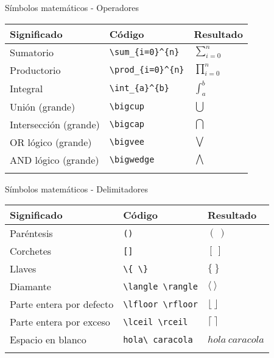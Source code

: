 \documentclass[
  ignorenonframetext,
]{beamer}
\begin{document}
\begin{frame}[fragile]{Símbolos matemáticos - Operadores}
\label{suxedmbolos-matemuxe1ticos---operadores}
\begin{longtable}[]{@{}lll@{}}
\toprule\noalign{}
Significado & Código & Resultado \\
\midrule\noalign{}
\endhead
Sumatorio & \texttt{\textbackslash{}sum\_\{i=0\}\^{}\{n\}} &
\(\sum_{i=0}^{n}\) \\
Productorio & \texttt{\textbackslash{}prod\_\{i=0\}\^{}\{n\}} &
\(\prod_{i=0}^{n}\) \\
Integral & \texttt{\textbackslash{}int\_\{a\}\^{}\{b\}} &
\(\int_{a}^{b}\) \\
Unión (grande) & \texttt{\textbackslash{}bigcup} & \(\bigcup\) \\
Intersección (grande) & \texttt{\textbackslash{}bigcap} & \(\bigcap\) \\
OR lógico (grande) & \texttt{\textbackslash{}bigvee} & \(\bigvee\) \\
AND lógico (grande) & \texttt{\textbackslash{}bigwedge} &
\(\bigwedge\) \\
\bottomrule\noalign{}
\end{longtable}
\end{frame}

\begin{frame}[fragile]{Símbolos matemáticos - Delimitadores}
\label{suxedmbolos-matemuxe1ticos---delimitadores}
\begin{longtable}[]{@{}lll@{}}
\toprule\noalign{}
Significado & Código & Resultado \\
\midrule\noalign{}
\endhead
Paréntesis & \texttt{()} & \((\ )\) \\
Corchetes & \texttt{{[}{]}} & \([\ ]\) \\
Llaves & \texttt{\textbackslash{}\{\ \textbackslash{}\}} & \(\{\ \}\) \\
Diamante & \texttt{\textbackslash{}langle\ \textbackslash{}rangle} &
\(\langle\ \rangle\) \\
Parte entera por defecto &
\texttt{\textbackslash{}lfloor\ \textbackslash{}rfloor} &
\(\lfloor\  \rfloor\) \\
Parte entera por exceso &
\texttt{\textbackslash{}lceil\ \textbackslash{}rceil} &
\(\lceil\ \rceil\) \\
Espacio en blanco & \texttt{hola\textbackslash{}\ caracola} &
\(hola\ caracola\) \\
\bottomrule\noalign{}
\end{longtable}
\end{frame}
\end{document}
